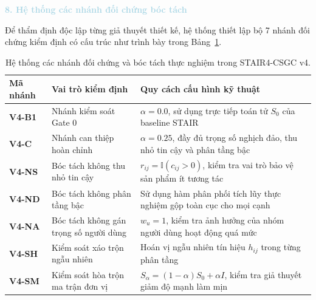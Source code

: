 \noindent\textcolor{lightblue}{\textbf{8. Hệ thống các nhánh đối chứng bóc tách}}

Để thẩm định độc lập từng giả thuyết thiết kế, hệ thống thiết lập bộ 7 nhánh đối chứng kiểm định có cấu trúc như trình bày trong Bảng~\ref{tab:stair_csgc_ablation_arms}.

\begin{table}[H]
\centering
\small
\setlength{\tabcolsep}{5.0pt}
\renewcommand{\arraystretch}{1.2}
\caption{Hệ thống các nhánh đối chứng và bóc tách thực nghiệm trong STAIR4-CSGC v4.}
\label{tab:stair_csgc_ablation_arms}
\begin{tabular}{llp{7.5cm}}
\toprule
\rowcolor{gray!15}\textbf{Mã nhánh} & \textbf{Vai trò kiểm định} & \textbf{Quy cách cấu hình kỹ thuật} \\
\midrule
\textbf{V4-B1} & Nhánh kiểm soát Gate 0 & $\alpha = 0.0$, sử dụng trực tiếp toán tử $S_0$ của baseline STAIR \\
\textbf{V4-C}  & Nhánh can thiệp hoàn chỉnh & $\alpha = 0.25$, đầy đủ trọng số nghịch đảo, thu nhỏ tin cậy và phân tầng bậc \\
\textbf{V4-NS} & Bóc tách không thu nhỏ tin cậy & $r_{ij} = \mathbb{I}(c_{ij} > 0)$, kiểm tra vai trò bảo vệ sản phẩm ít tương tác \\
\textbf{V4-ND} & Bóc tách không phân tầng bậc & Sử dụng hàm phân phối tích lũy thực nghiệm gộp toàn cục cho mọi cạnh \\
\textbf{V4-NA} & Bóc tách không gán trọng số người dùng & $w_u = 1$, kiểm tra ảnh hưởng của nhóm người dùng hoạt động quá mức \\
\textbf{V4-SH} & Kiểm soát xáo trộn ngẫu nhiên & Hoán vị ngẫu nhiên tín hiệu $h_{ij}$ trong từng phân tầng \\
\textbf{V4-SM} & Kiểm soát hòa trộn ma trận đơn vị & $S_\alpha = (1 - \alpha) S_0 + \alpha I$, kiểm tra giả thuyết giảm độ mạnh làm mịn \\
\bottomrule
\end{tabular}
\end{table}

